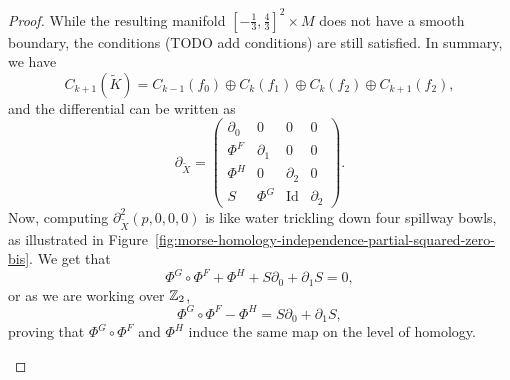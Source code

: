 \begin{proof}
While the resulting manifold $[-\frac{1}{3}, \frac{4}{3}]^2 \times M$ does not have a smooth boundary, the conditions (TODO add conditions) are still satisfied.
In summary, we have
\[
    C_{k+1}(\tilde{K}) = C_{k-1}(f_0) \oplus C_k(f_1) \oplus C_k(f_2) \oplus C_{k+1}(f_2)
,\] 
and the differential can be written as
\[
\partial_{\tilde{X}} = \begin{pmatrix}
    \partial_0 & 0 & 0 & 0\\
    \Phi^{F} &\partial_1 & 0 & 0 \\
    \Phi^{H} & 0 & \partial_2 & 0 \\
    S & \Phi^{G} & \operatorname{Id} & \partial_2
\end{pmatrix}
.\] 
Now, computing $\partial_{\tilde{X}}^2(p, 0, 0, 0)$ is like water trickling down four spillway bowls, as illustrated in Figure~\ref{fig:morse-homology-independence-partial-squared-zero-bis}. We get that
\[
\Phi^{G}  \circ  \Phi^{F} + \Phi^{H} + S \partial_0 + \partial_1 S = 0
,\] 
or as we are working over $\mathbb{Z}_2$,
\[
    \Phi^{G}  \circ \Phi^{F} - \Phi^{H} = S \partial_0 + \partial_1 S
,\] 
proving that $\Phi^{G}  \circ \Phi^{F}$ and $\Phi^{H}$ induce the same map on the level of homology.

\begin{figure*}
    \centering
    \caption{TODO morse homology independence partial squared zero bis}
    \label{fig:morse-homology-independence-partial-squared-zero-bis}
\end{figure*}
\end{proof}


